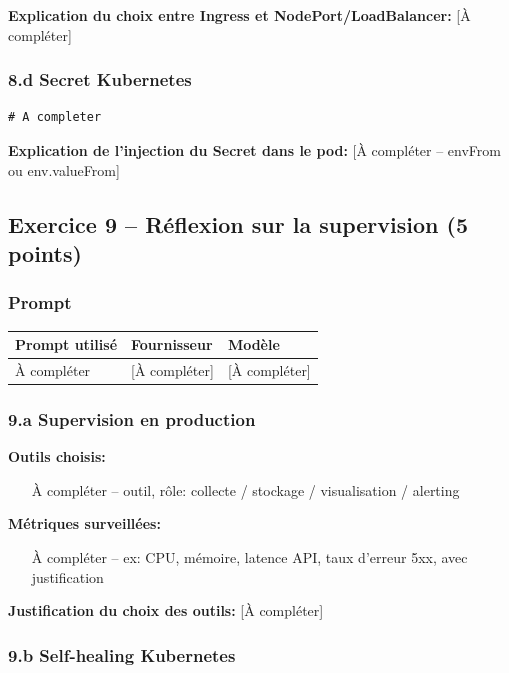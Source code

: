 \documentclass[11pt,a4paper]{article}
\begin{document}
\noindent\textbf{Explication du choix entre Ingress et NodePort/LoadBalancer:} [À compléter]

\subsubsection*{8.d Secret Kubernetes}
\begin{lstlisting}[language={},title=k8s/secret.yaml]
# A completer
\end{lstlisting}

\noindent\textbf{Explication de l'injection du Secret dans le pod:} [À compléter -- envFrom ou env.valueFrom]

\subsection{Exercice 9 -- Réflexion sur la supervision (5 points)}
\subsubsection*{Prompt}
\begin{longtable}{p{}p{}p{}}
\toprule
Prompt utilisé & Fournisseur & Modèle \\
\midrule
À compléter & [À compléter] & [À compléter] \\
\bottomrule
\end{longtable}

\subsubsection*{9.a Supervision en production}
\noindent\textbf{Outils choisis:}
\begin{itemize}
    \item [À compléter -- outil, rôle: collecte / stockage / visualisation / alerting]
\end{itemize}

\noindent\textbf{Métriques surveillées:}
\begin{itemize}
    \item [À compléter -- ex: CPU, mémoire, latence API, taux d'erreur 5xx, avec justification]
\end{itemize}

\noindent\textbf{Justification du choix des outils:} [À compléter]

\subsubsection*{9.b Self-healing Kubernetes}
\end{document}
